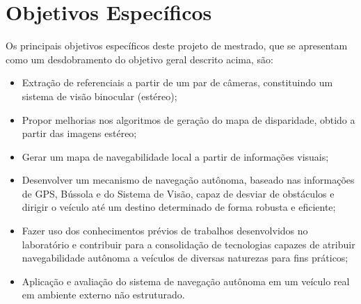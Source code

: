 \section{Objetivos Específicos}

Os principais objetivos específicos deste projeto de mestrado, que se apresentam
como um desdobramento do objetivo geral descrito acima, são:

\begin{itemize}

\item Extração de referenciais a partir de um par de câmeras, constituindo um
sistema de visão binocular (estéreo);

\item Propor melhorias nos algoritmos de geração do mapa de disparidade, obtido
a partir das imagens estéreo;

\item Gerar um mapa de navegabilidade local a partir de informações visuais;

\item Desenvolver um mecanismo de navegação autônoma, baseado nas informações de
GPS, Bússola e do Sistema de Visão, capaz de desviar de obstáculos e dirigir o
veículo até um destino determinado de forma robusta e eficiente;

\item Fazer uso dos conhecimentos prévios de trabalhos desenvolvidos no
laboratório e contribuir para a consolidação de tecnologias capazes de atribuir
navegabilidade autônoma a veículos de diversas naturezas para fins práticos;

\item Aplicação e avaliação do sistema de navegação autônoma em um veículo real
em ambiente externo não estruturado.

\end{itemize}


